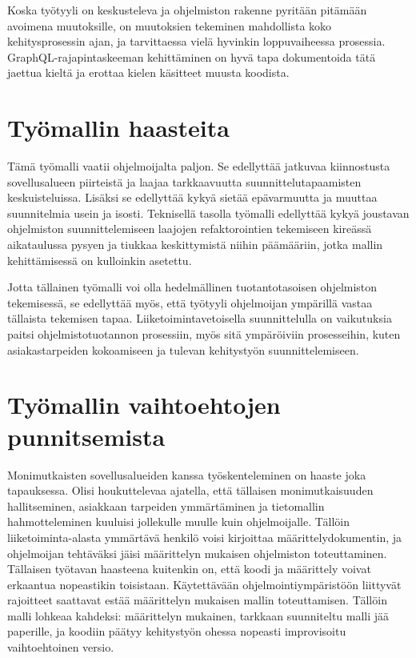Koska työtyyli on keskusteleva ja ohjelmiston rakenne pyritään pitämään
avoimena muutoksille, on muutoksien tekeminen mahdollista koko
kehitysprosessin ajan, ja tarvittaessa vielä hyvinkin loppuvaiheessa
prosessia. GraphQL-rajapintaskeeman kehittäminen on hyvä tapa
dokumentoida tätä jaettua kieltä ja erottaa kielen käsitteet muusta
koodista.

\hypertarget{tyuxf6mallin-haasteita}{%
\section{Työmallin haasteita}\label{tyuxf6mallin-haasteita}}

Tämä työmalli vaatii ohjelmoijalta paljon. Se edellyttää jatkuvaa
kiinnostusta sovellusalueen piirteistä ja laajaa tarkkaavuutta
suunnittelutapaamisten keskuisteluissa. Lisäksi se edellyttää kykyä
sietää epävarmuutta ja muuttaa suunnitelmia usein ja isosti. Teknisellä
tasolla työmalli edellyttää kykyä joustavan ohjelmiston
suunnittelemiseen laajojen refaktorointien tekemiseen kireässä
aikataulussa pysyen ja tiukkaa keskittymistä niihin päämääriin, jotka
mallin kehittämisessä on kulloinkin asetettu.

Jotta tällainen työmalli voi olla hedelmällinen tuotantotasoisen
ohjelmiston tekemisessä, se edellyttää myös, että työtyyli ohjelmoijan
ympärillä vastaa tällaista tekemisen tapaa. Liiketoimintavetoisella
suunnittelulla on vaikutuksia paitsi ohjelmistotuotannon prosessiin,
myös sitä ympäröiviin prosesseihin, kuten asiakastarpeiden kokoamiseen
ja tulevan kehitystyön suunnittelemiseen.

\hypertarget{tyuxf6mallin-vaihtoehtojen-punnitsemista}{%
\section{Työmallin vaihtoehtojen
punnitsemista}\label{tyuxf6mallin-vaihtoehtojen-punnitsemista}}

Monimutkaisten sovellusalueiden kanssa työskenteleminen on haaste joka
tapauksessa. Olisi houkuttelevaa ajatella, että tällaisen
monimutkaisuuden hallitseminen, asiakkaan tarpeiden ymmärtäminen ja
tietomallin hahmotteleminen kuuluisi jollekulle muulle kuin
ohjelmoijalle. Tällöin liiketoiminta-alasta ymmärtävä henkilö voisi
kirjoittaa määrittelydokumentin, ja ohjelmoijan tehtäväksi jäisi
määrittelyn mukaisen ohjelmiston toteuttaminen. Tällaisen työtavan
haasteena kuitenkin on, että koodi ja määrittely voivat erkaantua
nopeastikin toisistaan. Käytettävään ohjelmointiympäristöön liittyvät
rajoitteet saattavat estää määrittelyn mukaisen mallin toteuttamisen.
Tällöin malli lohkeaa kahdeksi: määrittelyn mukainen, tarkkaan
suunniteltu malli jää paperille, ja koodiin päätyy kehitystyön ohessa
nopeasti improvisoitu vaihtoehtoinen versio. \cite{evans:ddd}


